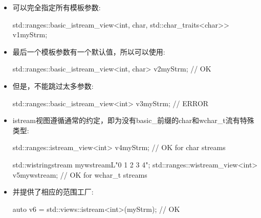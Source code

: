 \begin{itemize}
\item
可以完全指定所有模板参数:

\begin{cpp}
std::ranges::basic_istream_view<int, char, std::char_traits<char>> v1{myStrm};
\end{cpp}

\item
最后一个模板参数有一个默认值，所以可以使用:

\begin{cpp}
std::ranges::basic_istream_view<int, char> v2{myStrm}; // OK
\end{cpp}

\item
但是，不能跳过太多参数:

\begin{cpp}
std::ranges::basic_istream_view<int> v3{myStrm}; // ERROR
\end{cpp}

\item
istream视图遵循通常的约定，即为没有basic\_前缀的char和wchar\_t流有特殊类型:

\begin{cpp}
std::ranges::istream_view<int> v4{myStrm}; // OK for char streams

std::wistringstream mywstream{L"0 1 2 3 4"};
std::ranges::wistream_view<int> v5{mywstream}; // OK for wchar_t streams
\end{cpp}

\item
并提供了相应的范围工厂:

\begin{cpp}
auto v6 = std::views::istream<int>(myStrm); // OK
\end{cpp}
\end{itemize}


